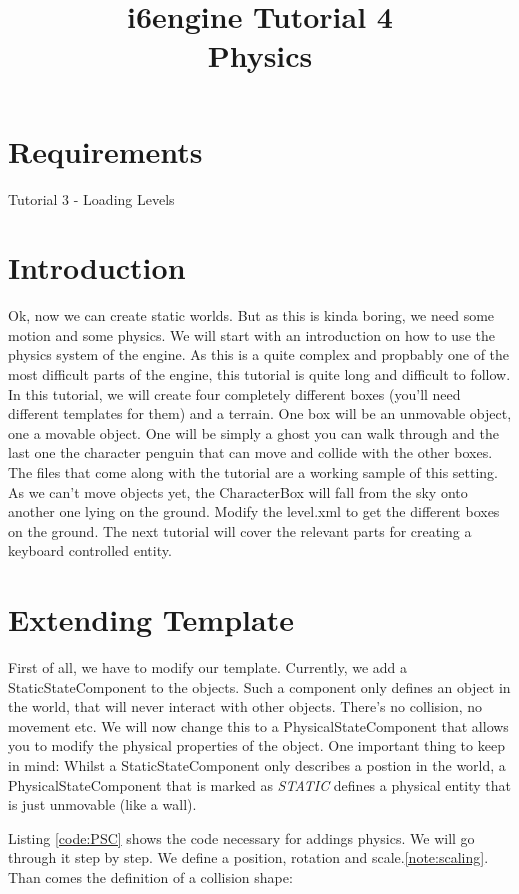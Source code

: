 \documentclass{article}
\title{i6engine Tutorial 4 \\ Physics}
\begin{document}
\section{Requirements}

Tutorial 3 - Loading Levels

\section{Introduction}

Ok, now we can create static worlds. But as this is kinda boring, we need some motion and some physics. We will start with an introduction on how to use the physics system of the engine. As this is a quite complex and propbably one of the most difficult parts of the engine, this tutorial is quite long and difficult to follow.\newline
In this tutorial, we will create four completely different boxes (you'll need different templates for them) and a terrain. One box will be an unmovable object, one a movable object. One will be simply a ghost you can walk through and the last one the character penguin that can move and collide with the other boxes. The files that come along with the tutorial are a working sample of this setting. As we can't move objects yet, the CharacterBox will fall from the sky onto another one lying on the ground. Modify the level.xml to get the different boxes on the ground. The next tutorial will cover the relevant parts for creating a keyboard controlled entity.

\section{Extending Template}

First of all, we have to modify our template. Currently, we add a StaticStateComponent to the objects. Such a component only defines an object in the world, that will never interact with other objects. There's no collision, no movement etc. We will now change this to a PhysicalStateComponent that allows you to modify the physical properties of the object. One important thing to keep in mind: Whilst a StaticStateComponent only describes a postion in the world, a PhysicalStateComponent that is marked as \textit{STATIC} defines a physical entity that is just unmovable (like a wall).\newline

Listing \ref{code:PSC} shows the code necessary for addings physics. We will go through it step by step.\newline
We define a position, rotation and scale.\ref{note:scaling}. Than comes the definition of a collision shape:
\end{document}
